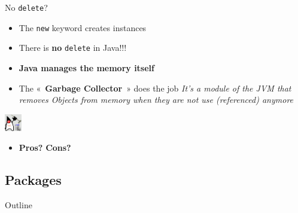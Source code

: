 \documentclass[English,c,%
hyperref={%
    pdftitle={FISA-DE2 OOP in Java},%
    pdfauthor={Muller, Gravier, Laforest, Subercaze},%
    pdfsubject={OOP in Java},%
    pdfkeywords={OOP, Java},%
    colorlinks=true,%
    urlcolor=blue,%
    linkcolor=%
    },%
xcolor={pdftex,svgnames} %
]{beamer}
\begin{document}
\begin{frame}{No \texttt{delete}?}
  \vspace{.2em}
  \begin{itemize}
    \item The \texttt{new} keyword creates instances
    \pause
    \item There is \textbf{no} \texttt{delete} in Java!!!
  \end{itemize}
  \pause
  \bigskip
  \begin{minipage}[c]{.90\linewidth}
    \begin{itemize}
      \item \textbf{Java manages the memory itself}
      \item The «~\textbf{Garbage Collector}~» does the job
      \textit{It's a module of the JVM that removes Objects from memory
        when they are not use (referenced) anymore} \pause
    \end{itemize}
  \end{minipage}
  \begin{minipage}[c]{.05\linewidth}
    \includegraphics[height=2em]{images01/GarbageCollector.png}
  \end{minipage}
\pause
\begin{itemize}
  \item \textbf{Pros?} \textbf{Cons?}
\end{itemize}
\pause
{}
\end{frame}


\subsection{Packages}
   \begin{frame}{Outline}
       \tableofcontents[currentsubsection]
   \end{frame}
\end{document}
